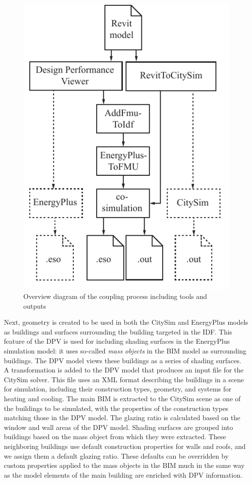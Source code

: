 \documentclass{tBPS2e}
\theoremstyle{plain}
\theoremstyle{definition}
\theoremstyle{remark}
\begin{document}
\begin{figure}[H]
\centering
\includegraphics[scale=0.7]{figures/UMEM_Workflow}
\caption{Overview diagram of the coupling process including tools and outputs \citep{thomas2014multiscale}}
\label{fig:OverallWorkflowProcess}
\end{figure}

Next, geometry is created to be used in both the CitySim and EnergyPlus models
as buildings and surfaces surrounding the building targeted in the IDF. This
feature of the DPV is used for including shading surfaces in the EnergyPlus
simulation model: it uses so-called \emph{mass objects} in the BIM model as
surrounding buildings. The DPV model views these buildings as a series of
shading surfaces. A transformation is added to the DPV model that produces an
input file for the CitySim solver. This file uses an XML format describing the
buildings in a scene for simulation, including their construction types,
geometry, and systems for heating and cooling. The main BIM is extracted to the
CitySim scene as one of the buildings to be simulated, with the properties of
the construction types matching those in the DPV model. The glazing ratio is
calculated based on the window and wall areas of the DPV model. Shading
surfaces are grouped into buildings based on the mass object from which they were extracted. These neighboring buildings use default construction properties for walls and roofs, and we assign them a default glazing ratio.
These defaults can be overridden by custom properties applied to the mass
objects in the BIM much in the same way as the model elements of the main
building are enriched with DPV information.
\end{document}
